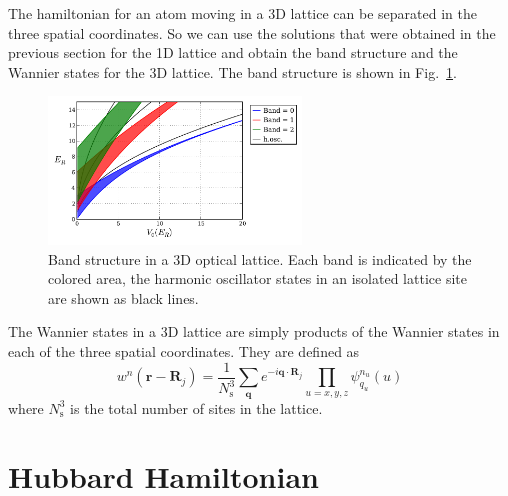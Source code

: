 \documentclass[11pt,letter]{article}
\newcommand{\bv}[1]{\ensuremath{\bm{#1}}}
\begin{document}
The hamiltonian for an atom moving in a  3D lattice can be separated in the
three spatial coordinates.  So we can use the solutions that were obtained in
the previous section for the 1D lattice and obtain the band structure and the
Wannier states for the 3D lattice.   
The band structure is shown in Fig.~\ref{fig:bands3d_V0}. 
\begin{figure}
\centering \includegraphics[width=0.6\textwidth]{../BandStructure_figures/bands3d_V0.pdf}
\caption[Band structure in 3D lattice.]{\small Band structure in a 3D optical lattice.  Each band is indicated by the colored area,  the harmonic oscillator states in an isolated lattice site are shown as black lines. }
\label{fig:bands3d_V0}
\end{figure}

The Wannier states in a 3D lattice are
simply products of the Wannier states in each of the three spatial coordinates.  They are defined as 
\begin{equation}
 w^{n}(\bv{r}-\bv{R}_{j}) =  \frac{1}{N_{\mathrm{s}}^{3}} \sum_{\bv{q}} e^{-i \bv{q}\cdot\bv{R}_{j} }
     \prod_{u=x,y,z}  \psi_{q_{u}}^{n_{u}}(u) 
 \label{eq:wannier3D}
\end{equation}
where $N_{\mathrm{s}}^{3}$ is the total number of sites in the lattice. 

\section{Hubbard Hamiltonian}
\end{document}
